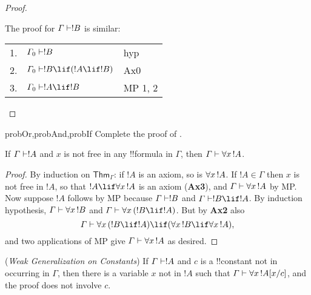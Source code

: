 \documentclass[../../include/open-logic-section]{subfiles}
\begin{document}
\begin{proof}
\begin{enumerate}
{{The proof for $\Gamma \Proves !B$ is similar:

\begin{tabular}{rll} 
1. & $\Gamma_0 \Proves !B$ & hyp \\ 
2. & $\Gamma_0 \Proves !B \lif (!A \lif !B) $ & Ax0\\ 
3. & $\Gamma_0 \Proves !A \lif !B$ & MP 1, 2\\
\end{tabular}}}

\end{enumerate} 
\end{proof}

\begin{probtag}{probOr,probAnd,probIf} Complete the proof of
. 
\end{probtag}

\begin{thm}[Generalization]  If $\Gamma \Proves
!A$ and $x$ is not free in any !!{formula} in $\Gamma$, then $\Gamma
\Proves \lforall[x][!A]$. 
\end{thm}

\begin{proof} By induction on $\mathsf{Thm}_\Gamma$: if $!A$ is an axiom,
so is $\lforall[x][!A]$. If $!A\in \Gamma$ then $x$ is not free in $!A$, so
that $!A \lif \lforall[x][!A]$ is an axiom (\textbf{Ax3}), and $\Gamma
\Proves \lforall[x][!A]$ by MP. Now suppose $!A$ follows by MP because
$\Gamma \Proves !B$ and $\Gamma \Proves !B \lif !A$. By induction
hypothesis, $\Gamma \Proves \lforall[x][!B]$ and $\Gamma \Proves
\lforall[x][( !B \lif !A)]$. But by \textbf{Ax2} also \[ \Gamma \Proves
\lforall[x][( !B \lif !A)] \lif (\lforall[x][ !B] \lif \lforall[x][!A]), \]
and two applications of MP give $\Gamma \Proves \lforall[x][!A]$ as
desired. \end{proof}

\begin{thm} (\emph{Weak Generalization on Constants})
If $\Gamma \Proves !A$ and $c$ is a !!{constant} not in occurring in
$\Gamma$, then there is a variable $x$ not in $!A$ such that $\Gamma
\Proves \lforall[x][\Subst{!A}{x}{c}]$, and the proof does not involve $c$.
\end{thm}
\end{document}
